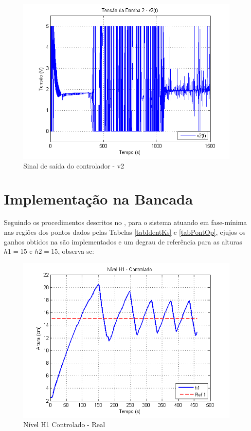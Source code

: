 \begin{figure}[H]
	\centering
	\includegraphics[height=0.35\paperheight, keepaspectratio]{img/nm_u2_wind.png}
	\caption{Sinal de saída do controlador - v2 }
	\label{figNm_u2_wind}
\end{figure}

\section{Implementação na Bancada} \label{secResImp}
Seguindo os procedimentos descritos no , para o sistema atuando em fase-mínima nas regiões dos pontos dados pelas Tabelas \ref{tabIdentKs} e \ref{tabPontOp}, cjujos os ganhos obtidos na  são implementados e um degrau de referência para as alturas $h1=15$ e $h2=15$, observa-se:
\begin{figure}[H]
	\centering
	\includegraphics[height=0.35\paperheight,keepaspectratio]{img/ctrl_realh1.png}
	\caption{\small Nível H1 Controlado - Real}
	\label{imgH1Real}
\end{figure}

